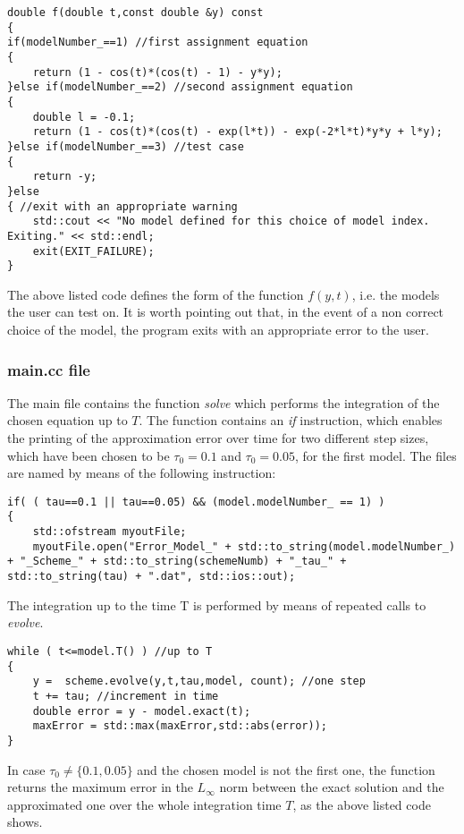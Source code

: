 \documentclass[11pt]{article}
\theoremstyle{theorem}
\theoremstyle{definition}
\begin{document}
\begin{lstlisting}
double f(double t,const double &y) const
{
if(modelNumber_==1) //first assignment equation
{
	return (1 - cos(t)*(cos(t) - 1) - y*y);
}else if(modelNumber_==2) //second assignment equation
{
	double l = -0.1;
	return (1 - cos(t)*(cos(t) - exp(l*t)) - exp(-2*l*t)*y*y + l*y);
}else if(modelNumber_==3) //test case
{
	return -y;
}else
{ //exit with an appropriate warning
	std::cout << "No model defined for this choice of model index. Exiting." << std::endl;
	exit(EXIT_FAILURE);
}
\end{lstlisting}

The above listed code defines the form of the function $f(y,t)$, i.e. the models the user can test on. It is worth pointing out that, in the event of a non correct choice of the model, the program exits with an appropriate error to the user.\\

\subsubsection{main.cc file}
The main file contains the function \emph{solve} which performs the integration of the chosen equation up to $T$. The function contains an \emph{if} instruction, which enables the printing of the approximation error over time for two different step sizes, which have been chosen to be $\tau_0=0.1$ and $\tau_0=0.05$, for the first model. The files are named by means of the following instruction:

\begin{lstlisting}
if( ( tau==0.1 || tau==0.05) && (model.modelNumber_ == 1) )
{
	std::ofstream myoutFile;
	myoutFile.open("Error_Model_" + std::to_string(model.modelNumber_) + "_Scheme_" + std::to_string(schemeNumb) + "_tau_" + std::to_string(tau) + ".dat", std::ios::out);
\end{lstlisting}

The integration up to the time T is performed by means of repeated calls to \emph{evolve}.

\begin{lstlisting}
while ( t<=model.T() ) //up to T
{
	y =  scheme.evolve(y,t,tau,model, count); //one step
	t += tau; //increment in time
	double error = y - model.exact(t); 
	maxError = std::max(maxError,std::abs(error));
}
\end{lstlisting}

In case $\tau_0\neq\lbrace 0.1, 0.05\rbrace$ and the chosen model is not the first one,  the function returns the maximum error in the $L_\infty$ norm between the exact solution and the approximated one over the whole integration time $T$, as the above listed code shows.\\
\end{document}

